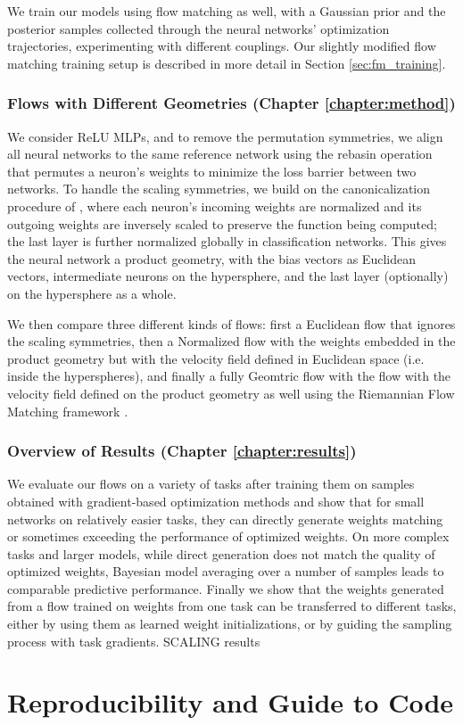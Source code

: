 We train our models using flow matching as well, with a Gaussian prior and the posterior samples collected through the neural networks' optimization trajectories, experimenting with different couplings. Our slightly modified flow matching training setup is described in more detail in Section \ref{sec:fm_training}.

\subsubsection{Flows with Different Geometries (Chapter \ref{chapter:method})}

We consider ReLU MLPs, and to remove the permutation symmetries, we align all neural networks to the same reference network using the rebasin operation \citep{ainsworthGitReBasinMerging2023,penaReBasinImplicitSinkhorn2023} that permutes a neuron's weights to minimize the loss barrier between two networks. To handle the scaling symmetries, we build on the canonicalization procedure of \citep{pittorinoDeepNetworksToroids2022}, where each neuron's incoming weights are normalized and its outgoing weights are inversely scaled to preserve the function being computed; the last layer is further normalized globally in classification networks. This gives the neural network a product geometry, with the bias vectors as Euclidean vectors, intermediate neurons on the hypersphere, and the last layer (optionally) on the hypersphere as a whole. 

We then compare three different kinds of flows: first a Euclidean flow that ignores the scaling symmetries, then a Normalized flow with the weights embedded in the product geometry but with the velocity field defined in Euclidean space (i.e. inside the hyperspheres), and finally a fully Geomtric flow with the flow with the velocity field defined on the product geometry as well using the Riemannian Flow Matching framework \citep{chenRiemannianFlowMatching2023}. 

\subsubsection{Overview of Results (Chapter \ref{chapter:results})}

We evaluate our flows on a variety of tasks after training them on samples obtained with gradient-based optimization methods and show that for small networks on relatively easier tasks, they can directly generate weights matching or sometimes exceeding the performance of optimized weights. On more complex tasks and larger models, while direct generation does not match the quality of optimized weights, Bayesian model averaging over a number of samples leads to comparable predictive performance. Finally we show that the weights generated from a flow trained on weights from one task can be transferred to different tasks, either by using them as learned weight initializations, or by guiding the sampling process with task gradients. {\color{red} SCALING results}



\section{Reproducibility and Guide to Code}


